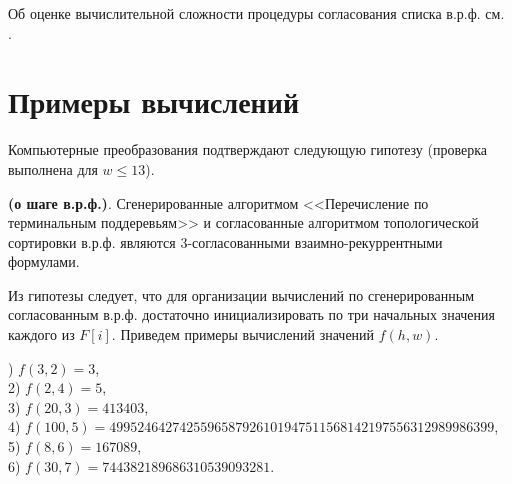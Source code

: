 Об оценке вычислительной сложности процедуры согласования списка в.р.ф. см. \cite{akm_17}.







\section{
Примеры вычислений %
}

Компьютерные преобразования подтверждают следующую гипотезу (проверка выполнена для $w\leq 13$).

\begin{hypothesis}
\textbf{ (о шаге в.р.ф.)}. Сгенерированные алгоритмом <<Перечисление по терминальным поддеревьям>> и согласованные алгоритмом топологической сортировки в.р.ф. являются $3$-согласованными взаимно-рекуррентными формулами.
\end{hypothesis}

Из гипотезы следует, что для организации вычислений по сгенерированным согласованным в.р.ф. достаточно инициализировать по три начальных значения каждого из $F[i]$.  Приведем примеры вычислений значений $f(h,w)$.
\par\smallskip
{\small
{}) $f(3,2)=3$,\\
2) $f(2,4) = 5$,\\
3) $f(20,3)=413403$,\\
4) $f(100,5)=4995246427425596587926101947511568142197556312989986399$, \\
5) $f(8,6)=167089$,\\
6) $f(30,7) = 744382189686310539093281$.
}

